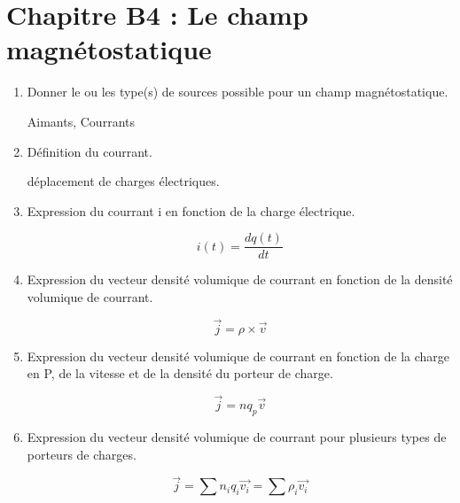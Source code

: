\section*{\centering Chapitre B4 : Le champ magnétostatique}
\begin{enumerate}[label=\arabic{enumi} - , left=0pt, itemsep=1em] %
   \item Donner le ou les type(s) de sources possible pour un champ magnétostatique. \par
    \begin{solution}
          Aimants, Courrants
    \end{solution}

    \item Définition du courrant.\par
    \begin{solution}
        déplacement de charges électriques.
    \end{solution}

    \item Expression du courrant i en fonction de la charge électrique.\par
    \begin{solution}
        \[ i(t) = \frac{dq(t)}{dt} \]
    \end{solution}


    \item Expression du vecteur densité volumique de courrant en fonction de la densité volumique de courrant.\par
    \begin{solution}
        \[ \vec{j} = \rho \times \vec{v} \]
    \end{solution}

    \item Expression du vecteur densité volumique de courrant en fonction de la charge en P, de la vitesse et de la densité du porteur de charge.\par
    \begin{solution}
         \[ \vec{j} = n q_p \vec{v} \]
    \end{solution}

    \item Expression du vecteur densité volumique de courrant pour plusieurs types de porteurs de charges.\par
    \begin{solution}
         \[ \vec{j} = \sum n_i q_i\vec{v_i} = \sum \rho_i\vec{v_i} \]
    \end{solution}


\end{enumerate}
